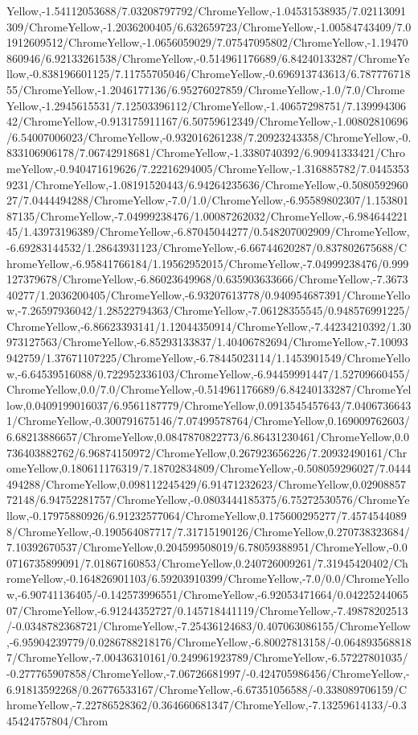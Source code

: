 {\begin{tikzternal}
Yellow,-1.54112053688/7.03208797792/ChromeYellow,-1.04531538935/7.02113091309/ChromeYellow,-1.2036200405/6.632659723/ChromeYellow,-1.00584743409/7.01912609512/ChromeYellow,-1.0656059029/7.07547095802/ChromeYellow,-1.19470860946/6.92133261538/ChromeYellow,-0.514961176689/6.84240133287/ChromeYellow,-0.838196601125/7.11755705046/ChromeYellow,-0.696913743613/6.78777671855/ChromeYellow,-1.2046177136/6.95276027859/ChromeYellow,-1.0/7.0/ChromeYellow,-1.2945615531/7.12503396112/ChromeYellow,-1.40657298751/7.13999430642/ChromeYellow,-0.913175911167/6.50759612349/ChromeYellow,-1.00802810696/6.54007006023/ChromeYellow,-0.932016261238/7.20923243358/ChromeYellow,-0.833106906178/7.06742918681/ChromeYellow,-1.3380740392/6.90941333421/ChromeYellow,-0.940471619626/7.22216294005/ChromeYellow,-1.316885782/7.04453539231/ChromeYellow,-1.08191520443/6.94264235636/ChromeYellow,-0.508059296027/7.0444494288/ChromeYellow,-7.0/1.0/ChromeYellow,-6.95589802307/1.15380187135/ChromeYellow,-7.04999238476/1.00087262032/ChromeYellow,-6.98464422145/1.43973196389/ChromeYellow,-6.87045044277/0.548207002909/ChromeYellow,-6.69283144532/1.28643931123/ChromeYellow,-6.66744620287/0.837802675688/ChromeYellow,-6.95841766184/1.19562952015/ChromeYellow,-7.04999238476/0.999127379678/ChromeYellow,-6.86023649968/0.635903633666/ChromeYellow,-7.367340277/1.2036200405/ChromeYellow,-6.93207613778/0.940954687391/ChromeYellow,-7.26597936042/1.28522794363/ChromeYellow,-7.06128355545/0.948576991225/ChromeYellow,-6.86623393141/1.12044350914/ChromeYellow,-7.44234210392/1.30973127563/ChromeYellow,-6.85293133837/1.40406782694/ChromeYellow,-7.10093942759/1.37671107225/ChromeYellow,-6.78445023114/1.1453901549/ChromeYellow,-6.64539516088/0.722952336103/ChromeYellow,-6.94459991447/1.52709660455/ChromeYellow,0.0/7.0/ChromeYellow,-0.514961176689/6.84240133287/ChromeYellow,0.0409199016037/6.9561187779/ChromeYellow,0.0913545457643/7.04067366431/ChromeYellow,-0.300791675146/7.07499578764/ChromeYellow,0.169009762603/6.68213886657/ChromeYellow,0.0847870822773/6.86431230461/ChromeYellow,0.0736403882762/6.96874150972/ChromeYellow,0.267923656226/7.20932490161/ChromeYellow,0.180611176319/7.18702834809/ChromeYellow,-0.508059296027/7.0444494288/ChromeYellow,0.098112245429/6.91471232623/ChromeYellow,0.0290885772148/6.94752281757/ChromeYellow,-0.0803444185375/6.75272530576/ChromeYellow,-0.17975880926/6.91232577064/ChromeYellow,0.175600295277/7.45745440898/ChromeYellow,-0.190564087717/7.31715190126/ChromeYellow,0.270738323684/7.10392670537/ChromeYellow,0.204599508019/6.78059388951/ChromeYellow,-0.00716735899091/7.01867160853/ChromeYellow,0.240726009261/7.31945420402/ChromeYellow,-0.164826901103/6.59203910399/ChromeYellow,-7.0/0.0/ChromeYellow,-6.90741136405/-0.142573996551/ChromeYellow,-6.92053471664/0.0422524406507/ChromeYellow,-6.91244352727/0.145718441119/ChromeYellow,-7.49878202513/-0.0348782368721/ChromeYellow,-7.25436124683/0.407063086155/ChromeYellow,-6.95904239779/0.0286788218176/ChromeYellow,-6.80027813158/-0.0648935688187/ChromeYellow,-7.00436310161/0.249961923789/ChromeYellow,-6.57227801035/-0.277765907858/ChromeYellow,-7.06726681997/-0.424705986456/ChromeYellow,-6.91813592268/0.26776533167/ChromeYellow,-6.67351056588/-0.338089706159/ChromeYellow,-7.22786528362/0.364660681347/ChromeYellow,-7.13259614133/-0.345424757804/Chrom
\end{tikzternal}}
